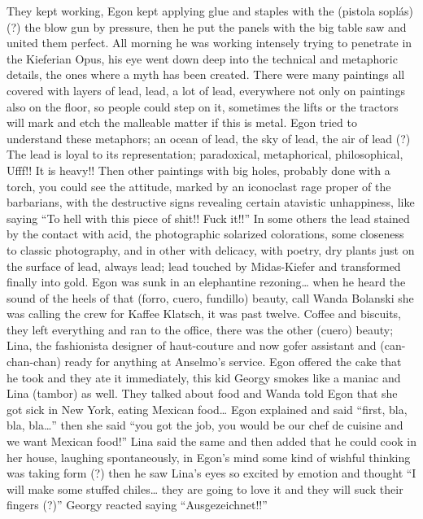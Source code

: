 \documentclass[smalldemyvopaper,11pt,twoside,onecolumn,openright,extrafontsizes]{memoir}
\begin{document}
They kept working, Egon kept applying glue and staples with the (pistola soplás) (?) the blow gun by pressure, then he put the panels with the big table saw and united them perfect. All morning he was working intensely trying to penetrate in the Kieferian Opus, his eye went down deep into the technical and metaphoric details, the ones where a myth has been created. There were many paintings all covered with layers of lead, lead, a lot of lead, everywhere not only on paintings also on the floor, so people could step on it, sometimes the lifts or the tractors will mark and etch the malleable matter if this is metal.  Egon tried to understand these metaphors; an ocean of lead, the sky of lead, the air of lead (?) The lead is loyal to its representation; paradoxical, metaphorical, philosophical, Ufff!! It is heavy!! Then other paintings with big holes, probably done with a torch, you could see the attitude, marked by an iconoclast rage proper of the barbarians, with the destructive signs revealing certain atavistic unhappiness, like saying “To hell with this piece of shit!! Fuck it!!” In some others the lead stained by the contact with acid, the photographic solarized colorations, some closeness to classic photography, and in other with delicacy, with poetry, dry plants just on the surface of lead, always lead; lead touched by Midas-Kiefer and transformed finally into gold. Egon was sunk in an elephantine rezoning… when he heard the sound of the heels of that (forro, cuero, fundillo) beauty, call Wanda Bolanski she was calling the crew for Kaffee Klatsch, it was past twelve. Coffee and biscuits, they left everything and ran to the office, there was the other (cuero) beauty; Lina, the fashionista designer of haut-couture and now gofer assistant and (can-chan-chan) ready for anything at Anselmo’s service. Egon offered the cake that he took and they ate it immediately, this kid Georgy smokes like a maniac and Lina (tambor) as well. They talked about food and Wanda told Egon that she got sick in New York, eating Mexican food… Egon explained and said “first, bla, bla, bla…”   then she said “you got the job, you would be our chef de cuisine and we want Mexican food!”   Lina said the same and then added that he could cook in her house, laughing spontaneously, in Egon’s mind some kind of wishful thinking was taking form (?) then he saw Lina’s eyes so excited by emotion and thought “I will make some stuffed chiles… they are going to love it and they will suck their fingers (?)” Georgy reacted saying “Ausgezeichnet!!”  
\end{document}
